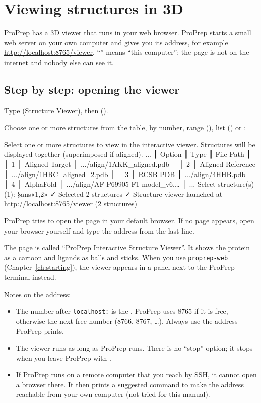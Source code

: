 \section{Viewing structures in 3D}
\label{sec:compare-viewer}

ProPrep has a 3D viewer that runs in your web browser. ProPrep starts a small
web server on your own computer and gives you its address, for example
\url{http://localhost:8765/viewer}. ``'' means ``this
computer'': the page is not on the internet and nobody else can see it.

\subsection{Step by step: opening the viewer}

\begin{steps}
  \item Type  (Structure Viewer), then 
        ().
  \item Choose one or more structures from the table, by number, range
        (), list () or :
\begin{screen}
Select one or more structures to view in the interactive viewer.
Structures will be displayed together (superimposed if aligned).
...
┃ Option ┃ Type              ┃ File Path                          ┃
│   1    │ Aligned Target    │ .../align/1AKK_aligned.pdb         │
│   2    │ Aligned Reference │ .../align/1HRC_aligned_2.pdb       │
│   3    │ RCSB PDB          │ .../align/4HHB.pdb                 │
│   4    │ AlphaFold         │ .../align/AF-P69905-F1-model_v6.…  │
...
Select structure(s) (1): §ans«1,2»
✓ Selected 2 structures
✓ Structure viewer launched at http://localhost:8765/viewer (2 structures)
\end{screen}
  \item ProPrep tries to open the page in your default browser. If no page
        appears, open your browser yourself and type the address from the last
        line.
\end{steps}

The page is called ``ProPrep Interactive Structure Viewer''. It shows the
protein as a cartoon and ligands as balls and sticks. When you use
\texttt{proprep-web} (Chapter~\ref{ch:starting}), the viewer appears in a panel
next to the ProPrep terminal instead.

Notes on the address:
\begin{itemize}
  \item The number after \texttt{localhost:} is the . ProPrep uses
        8765 if it is free, otherwise the next free number (8766, 8767,
        \ldots). Always use the address ProPrep prints.
  \item The viewer runs as long as ProPrep runs. There is no ``stop'' option;
        it stops when you leave ProPrep with .
  \item If ProPrep runs on a remote computer that you reach by SSH, it cannot
        open a browser there. It then prints a suggested command to make the
        address reachable from your own computer (not tried for this manual).
\end{itemize}

